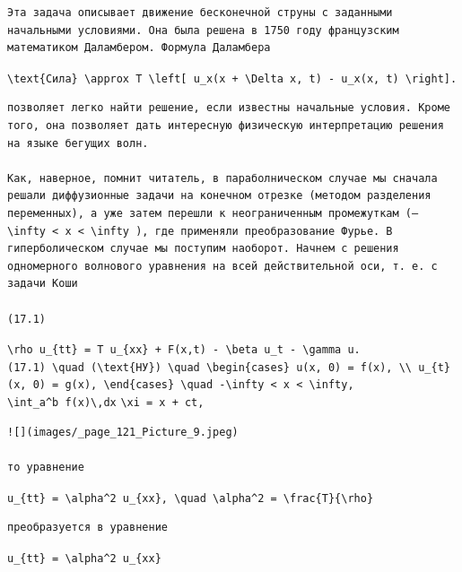 \documentclass[
  ukrainian,
]{article}
\begin{document}
\begin{verbatim}
Эта задача описывает движение бесконечной струны с заданными начальными условиями. Она была решена в 1750 году французским математиком Даламбером. Формула Даламбера
\end{verbatim}

\texttt{\textbackslash{}text\{Сила\}\ \textbackslash{}approx\ T\ \textbackslash{}left{[}\ u\_x(x\ +\ \textbackslash{}Delta\ x,\ t)\ -\ u\_x(x,\ t)\ \textbackslash{}right{]}.}

\begin{verbatim}
позволяет легко найти решение, если известны начальные условия. Кроме того, она позволяет дать интересную физическую интерпретацию решения на языке бегущих волн.

Как, наверное, помнит читатель, в параболническом случае мы сначала решали диффузионные задачи на конечном отрезке (методом разделения переменных), а уже затем перешли к неограниченным промежуткам (—  \infty < x < \infty ), где применяли преобразование Фурье. В гиперболическом случае мы поступим наоборот. Начнем с решения одномерного волнового уравнения на всей действительной оси, т. е. с задачи Коши

(17.1)
\end{verbatim}

\texttt{\textbackslash{}rho\ u\_\{tt\}\ =\ T\ u\_\{xx\}\ +\ F(x,t)\ -\ \textbackslash{}beta\ u\_t\ -\ \textbackslash{}gamma\ u.}
\texttt{(17.1)\ \textbackslash{}quad\ (\textbackslash{}text\{НУ\})\ \textbackslash{}quad\ \textbackslash{}begin\{cases\}\ u(x,\ 0)\ =\ f(x),\ \textbackslash{}\textbackslash{}\ u\_\{t\}(x,\ 0)\ =\ g(x),\ \textbackslash{}end\{cases\}\ \textbackslash{}quad\ -\textbackslash{}infty\ \textless{}\ x\ \textless{}\ \textbackslash{}infty,}
\texttt{\textbackslash{}int\_a\^{}b\ f(x)\textbackslash{},dx}
\texttt{\textbackslash{}xi\ =\ x\ +\ ct,}

\begin{verbatim}
![](images/_page_121_Picture_9.jpeg)

то уравнение
\end{verbatim}

\texttt{u\_\{tt\}\ =\ \textbackslash{}alpha\^{}2\ u\_\{xx\},\ \textbackslash{}quad\ \textbackslash{}alpha\^{}2\ =\ \textbackslash{}frac\{T\}\{\textbackslash{}rho\}}

\begin{verbatim}
преобразуется в уравнение
\end{verbatim}

\texttt{u\_\{tt\}\ =\ \textbackslash{}alpha\^{}2\ u\_\{xx\}}
\end{document}
